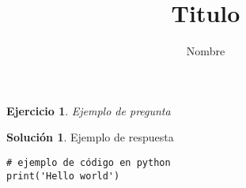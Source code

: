 \documentclass[a4paper,11pt]{article}
\author{Nombre}
\title{Titulo}
\theoremstyle{plain} %
\newtheorem*{pregunta}{Ejercicio}
\theoremstyle{definition} %
\newtheorem*{solucion}{Solución} %
\begin{document}
    \maketitle %



    \begin{pregunta}
        Ejemplo de pregunta
    \end{pregunta}

    \begin{solucion}
        Ejemplo de respuesta

        \begin{verbatim}
# ejemplo de código en python
print('Hello world')
        \end{verbatim}

    \end{solucion}
\end{document}
